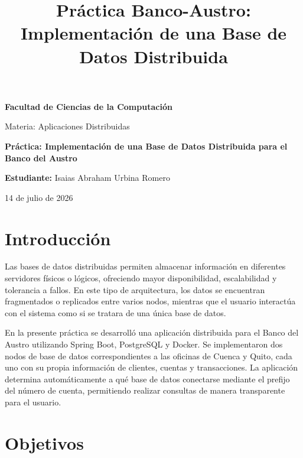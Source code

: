 \documentclass[11pt,a4paper]{article}
\title{\textbf{Práctica Banco-Austro: Implementación de una Base de Datos Distribuida}}
\author{}
\date{}
\begin{document}
\begin{titlepage}
    \centering
    \vspace*{2cm}

    {\Large \textbf{Facultad de Ciencias de la Computación}\par}
    \vspace{0.5cm}
    {\large Materia: Aplicaciones Distribuidas\par}

    \vspace{3cm}

    {\huge \textbf{Práctica: Implementación de una Base de Datos Distribuida para el Banco del Austro}\par}

    \vspace{3cm}

    {\Large \textbf{Estudiante:} Isaias Abraham Urbina Romero\par}

    \vfill

    {\large 14 de julio de 2026\par}

\end{titlepage}

\section*{Introducción}

Las bases de datos distribuidas permiten almacenar información en diferentes servidores físicos o lógicos, ofreciendo mayor disponibilidad, escalabilidad y tolerancia a fallos. En este tipo de arquitectura, los datos se encuentran fragmentados o replicados entre varios nodos, mientras que el usuario interactúa con el sistema como si se tratara de una única base de datos.

En la presente práctica se desarrolló una aplicación distribuida para el Banco del Austro utilizando Spring Boot, PostgreSQL y Docker. Se implementaron dos nodos de base de datos correspondientes a las oficinas de Cuenca y Quito, cada uno con su propia información de clientes, cuentas y transacciones. La aplicación determina automáticamente a qué base de datos conectarse mediante el prefijo del número de cuenta, permitiendo realizar consultas de manera transparente para el usuario.

\FloatBarrier
\section{Objetivos}
\end{document}
